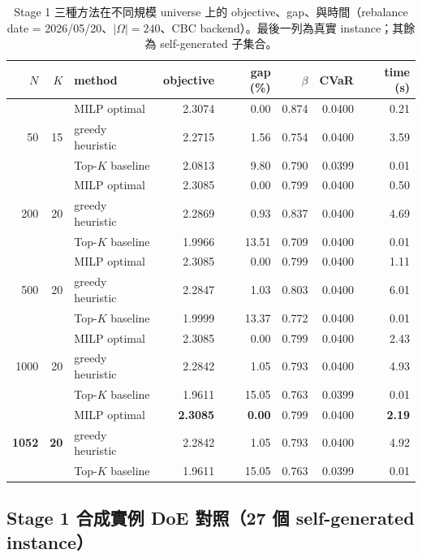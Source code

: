 \documentclass[11pt,a4paper]{article}
\begin{document}
\begin{table}[!hbt]
\centering
\small
\begin{tabular}{rrl rrrrr}
\toprule
$N$ & $K$ & method & objective & gap (\%) & $\beta$ & CVaR & time (s) \\
\midrule
\multirow{3}{*}{50} & \multirow{3}{*}{15}
   & MILP optimal      & 2.3074 & 0.00 & 0.874 & 0.0400 & 0.21 \\
&  & greedy heuristic  & 2.2715 & 1.56 & 0.754 & 0.0400 & 3.59 \\
&  & Top-$K$ baseline  & 2.0813 & 9.80 & 0.790 & 0.0399 & 0.01 \\
\midrule
\multirow{3}{*}{200} & \multirow{3}{*}{20}
   & MILP optimal      & 2.3085 & 0.00 & 0.799 & 0.0400 & 0.50 \\
&  & greedy heuristic  & 2.2869 & 0.93 & 0.837 & 0.0400 & 4.69 \\
&  & Top-$K$ baseline  & 1.9966 & 13.51 & 0.709 & 0.0400 & 0.01 \\
\midrule
\multirow{3}{*}{500} & \multirow{3}{*}{20}
   & MILP optimal      & 2.3085 & 0.00 & 0.799 & 0.0400 & 1.11 \\
&  & greedy heuristic  & 2.2847 & 1.03 & 0.803 & 0.0400 & 6.01 \\
&  & Top-$K$ baseline  & 1.9999 & 13.37 & 0.772 & 0.0400 & 0.01 \\
\midrule
\multirow{3}{*}{1000} & \multirow{3}{*}{20}
   & MILP optimal      & 2.3085 & 0.00 & 0.799 & 0.0400 & 2.43 \\
&  & greedy heuristic  & 2.2842 & 1.05 & 0.793 & 0.0400 & 4.93 \\
&  & Top-$K$ baseline  & 1.9611 & 15.05 & 0.763 & 0.0399 & 0.01 \\
\midrule
\multirow{3}{*}{\textbf{1052}} & \multirow{3}{*}{\textbf{20}}
   & MILP optimal      & \textbf{2.3085} & \textbf{0.00} & 0.799 & 0.0400 & \textbf{2.19} \\
&  & greedy heuristic  & 2.2842 & 1.05 & 0.793 & 0.0400 & 4.92 \\
&  & Top-$K$ baseline  & 1.9611 & 15.05 & 0.763 & 0.0399 & 0.01 \\
\bottomrule
\end{tabular}
\caption{Stage 1 三種方法在不同規模 universe 上的 objective、gap、與時間（rebalance date = 2026/05/20、$|\Omega|=240$、CBC backend）。最後一列為真實 instance；其餘為 self-generated 子集合。}
\label{tab:bench-sweep}
\end{table}

\subsection{Stage 1 合成實例 DoE 對照（27 個 self-generated instance）}
\end{document}
